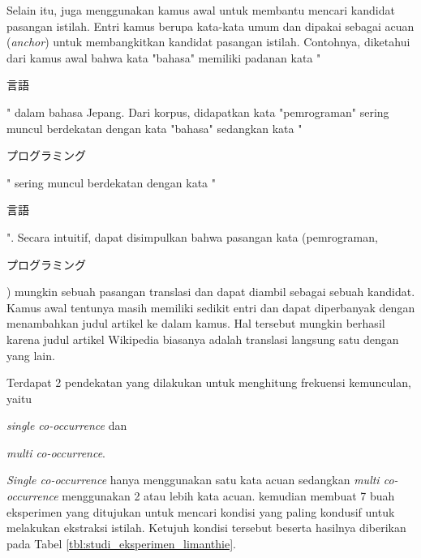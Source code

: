 \documentclass[../main/main.tex]{subfiles}
\begin{document}
Selain itu, \textcite{limanthie} juga menggunakan kamus awal untuk membantu mencari kandidat pasangan istilah. Entri kamus berupa kata-kata umum dan dipakai sebagai acuan (\textit{anchor}) untuk membangkitkan kandidat pasangan istilah. Contohnya, diketahui dari kamus awal bahwa kata "bahasa" memiliki padanan kata "\begin{CJK}{UTF8}{min}言語\end{CJK}" dalam bahasa Jepang. Dari korpus, didapatkan kata "pemrograman" sering muncul berdekatan dengan kata "bahasa" sedangkan kata "\begin{CJK}{UTF8}{min}プログラミング\end{CJK}" sering muncul berdekatan dengan kata "\begin{CJK}{UTF8}{min}言語\end{CJK}". Secara intuitif, dapat disimpulkan bahwa pasangan kata (pemrograman,\begin{CJK}{UTF8}{min}プログラミング\end{CJK}) mungkin sebuah pasangan translasi dan dapat diambil sebagai sebuah kandidat. Kamus awal tentunya masih memiliki sedikit entri dan dapat diperbanyak dengan menambahkan judul artikel ke dalam kamus. Hal tersebut mungkin berhasil karena judul artikel Wikipedia biasanya adalah translasi langsung satu dengan yang lain.

Terdapat 2 pendekatan yang dilakukan \textcite{limanthie} untuk menghitung frekuensi kemunculan, yaitu
\begin{inparaenum}[(1)]
\item \textit{single co-occurrence} dan
\item \textit{multi co-occurrence}.
\end{inparaenum}
\textit{Single co-occurrence} hanya menggunakan satu kata acuan sedangkan \textit{multi co-occurrence} menggunakan 2 atau lebih kata acuan. \textcite{limanthie} kemudian membuat 7 buah eksperimen yang ditujukan untuk mencari kondisi yang paling kondusif untuk melakukan ekstraksi istilah. Ketujuh kondisi tersebut beserta hasilnya diberikan pada Tabel \ref{tbl:studi_eksperimen_limanthie}.
\end{document}
